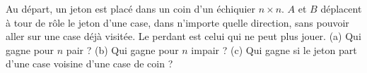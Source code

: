 Au départ, un jeton est placé dans un coin d'un échiquier $n \times n$. $A$ et $B$ déplacent à tour de rôle le jeton d'une case, dans n'importe quelle direction, sans pouvoir aller sur une case déjà visitée. Le perdant est celui qui ne peut plus jouer. (a) Qui gagne pour $n$ pair ? (b) Qui gagne pour $n$ impair ? (c) Qui gagne si le jeton part d'une case voisine d'une case de coin ?
